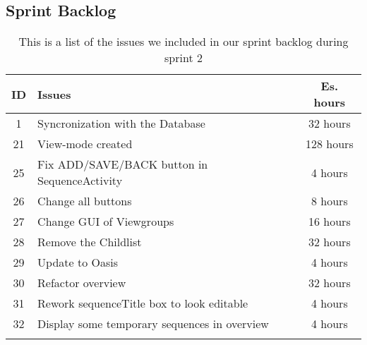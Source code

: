 \subsection{Sprint Backlog}\label{subsec:spr2_sprblog}
\begin{longtable} { | c | p{12cm} | c | } 
\hline
	ID 	&	Issues	&		 Es. hours \\\hline
	1	& 	Syncronization with the Database	&	32 hours	\\\hline
	21	& 	View-mode created	&	128 hours	\\\hline	
	25	& 	Fix ADD/SAVE/BACK button in SequenceActivity	&	4 hours	\\\hline
	26	& 	Change all buttons	&	8 hours	\\\hline
	27	& 	Change GUI of Viewgroups	&	16 hours	\\\hline
	28	& 	Remove the Childlist	&	32 hours	\\\hline
	29	& 	Update to Oasis	&	4 hours	\\\hline
	30	& 	Refactor overview	&	32 hours	\\\hline
	31	& 	Rework sequenceTitle box to look editable	&	4 hours	\\\hline
	32	& 	Display some temporary sequences in overview	&	4 hours	\\\hline
\caption{This is a list of the issues we included in our sprint backlog during sprint 2}
\label{tab:spr2_prodblog}
\end{longtable}